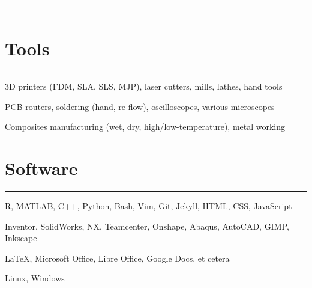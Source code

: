 

\newlength{\rcollength}\setlength{\rcollength}{3.0in}%
\begin{tabular} {
  p{}
  p{}
  p{}}
	\begin{flushleft}
		\address
	\end{flushleft}
	&
	\begin{center}
	\Large{\author}
	\end{center}
	&
	\begin{flushright}
		{\phnum}\\
 	    {\email} 	 
	\end{flushright}
\end{tabular}

\section{Tools}
\noindent\rule{\textwidth}{\hlinewidth}
    \begin{innerlist}
    \item 3D printers (FDM, SLA, SLS, MJP), laser cutters, mills, lathes, hand tools
    \item PCB routers, soldering (hand, re-flow), oscilloscopes, various microscopes
    \item Composites manufacturing (wet, dry, high/low-temperature), metal working
    \end{innerlist}

\section{Software}
\noindent\rule{\textwidth}{\hlinewidth}
    \begin{innerlist}
        \item R, MATLAB, C++, Python, Bash, Vim, Git, Jekyll, HTML, CSS, JavaScript
        \item Inventor, SolidWorks, NX, Teamcenter, Onshape, Abaqus, AutoCAD, GIMP, Inkscape
        \item \LaTeX, Microsoft Office, Libre Office, Google Docs, et cetera
        \item Linux, Windows
    \end{innerlist}

